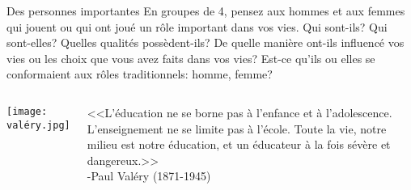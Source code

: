 \begin{frame}{Des personnes importantes}
  En groupes de 4, pensez aux hommes et aux femmes qui jouent ou qui ont joué un rôle important dans vos vies.
  Qui sont-ils?
  Qui sont-elles? Quelles qualités possèdent-ils?
  De quelle manière ont-ils influencé vos vies ou les choix que vous avez faits dans vos vies?
  Est-ce qu'ils ou elles se conformaient aux rôles traditionnels: homme, femme?
  \begin{columns}
      \begin{center}
        \texttt{[image: valéry.jpg]}
      \end{center}
      <<L'éducation ne se borne pas à l'enfance et à l'adolescence.
      L'enseignement ne se limite pas à l'école.
      Toute la vie, notre milieu est notre éducation, et un éducateur à la fois sévère et dangereux.>> \\
      \hfill -Paul Valéry (1871-1945)
  \end{columns}
\end{frame}